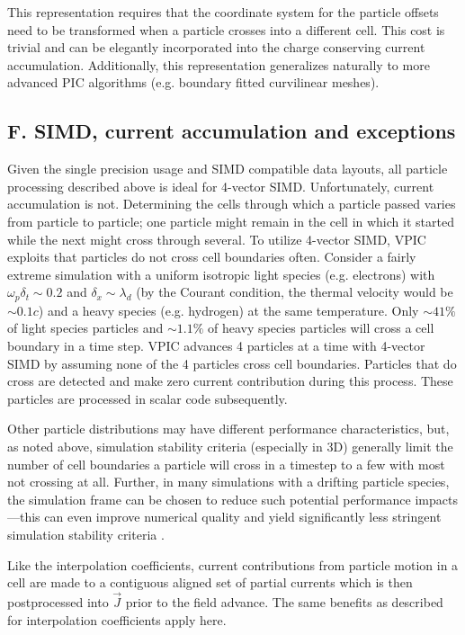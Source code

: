 \documentclass[aps,prl,preprint,preprintnumbers,groupedaddress]{revtex4}
\newcommand{\vecJ}{\vec{J}}
\begin{document}
This representation requires that the coordinate system for the
particle offsets need to be transformed when a particle crosses into a
different cell.  This cost is trivial and can be elegantly
incorporated into the charge conserving current accumulation.
Additionally, this representation generalizes naturally to more
advanced PIC algorithms (e.g. boundary fitted curvilinear meshes).

\subsection{F. SIMD, current accumulation and exceptions}

Given the single precision usage and SIMD compatible data layouts, all
particle processing described above is ideal for 4-vector SIMD.
Unfortunately, current accumulation is not.  Determining the cells
through which a particle passed varies from particle to particle; one
particle might remain in the cell in which it started while the next
might cross through several.  To utilize 4-vector SIMD, VPIC exploits
that particles do not cross cell boundaries often.  Consider a fairly
extreme simulation with a uniform isotropic light species
(e.g. electrons) with $\omega_p \delta_t \sim 0.2$ and $\delta_x \sim
\lambda_d$ (by the Courant condition, the thermal velocity would be
$\sim 0.1c$) and a heavy species (e.g. hydrogen) at the same
temperature.  Only $\sim 41\%$ of light species particles and $\sim
1.1\%$ of heavy species particles will cross a cell boundary in a time
step.  VPIC advances 4 particles at a time with 4-vector SIMD by
assuming none of the 4 particles cross cell boundaries.  Particles
that do cross are detected and make zero current contribution during
this process.  These particles are processed in scalar code
subsequently.

Other particle distributions may have different performance
characteristics, but, as noted above, simulation stability criteria
(especially in 3D) generally limit the number of cell boundaries a
particle will cross in a timestep to a few with most not crossing at
all.  Further, in many simulations with a drifting particle species,
the simulation frame can be chosen to reduce such potential
performance impacts---this can even improve numerical quality and
yield significantly less stringent simulation stability criteria
\cite{Vay_2007}.

Like the interpolation coefficients, current contributions from
particle motion in a cell are made to a contiguous aligned set of
partial currents which is then postprocessed into $\vecJ$ prior to the
field advance.  The same benefits as described for interpolation
coefficients apply here.
\end{document}
